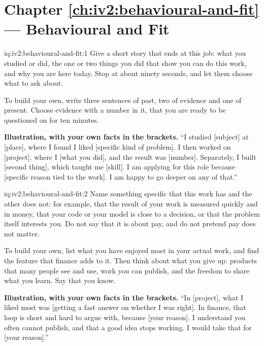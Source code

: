 \section*{Chapter \ref{ch:iv2:behavioural-and-fit} --- Behavioural and Fit}

\begin{solution}{iq:iv2:behavioural-and-fit:1}
Give a short story that ends at this job: what you studied or did, the one or two things you did that show you can do this work, and why you are here today. Stop at about ninety seconds, and let them choose what to ask about.

To build your own, write three sentences of past, two of evidence and one of present. Choose evidence with a number in it, that you are ready to be questioned on for ten minutes.

\textbf{Illustration, with your own facts in the brackets.} ``I studied [subject] at [place], where I found I liked [specific kind of problem]. I then worked on [project], where I [what you did], and the result was [number]. Separately, I built [second thing], which taught me [skill]. I am applying for this role because [specific reason tied to the work]. I am happy to go deeper on any of that.''

\end{solution}

\begin{solution}{iq:iv2:behavioural-and-fit:2}
Name something specific that this work has and the other does not: for example, that the result of your work is measured quickly and in money, that your code or your model is close to a decision, or that the problem itself interests you. Do not say that it is about pay, and do not pretend pay does not matter.

To build your own, list what you have enjoyed most in your actual work, and find the feature that finance adds to it. Then think about what you give up: products that many people see and use, work you can publish, and the freedom to share what you learn. Say that you know.

\textbf{Illustration, with your own facts in the brackets.} ``In [project], what I liked most was [getting a fast answer on whether I was right]. In finance, that loop is short and hard to argue with, because [your reason]. I understand you often cannot publish, and that a good idea stops working. I would take that for [your reason].''

\end{solution}

